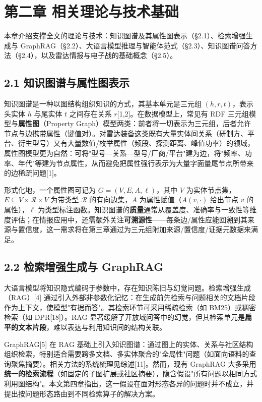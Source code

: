\documentclass[12pt,a4paper]{ctexart}
\begin{document}
\section*{第二章 相关理论与技术基础}

本章介绍支撑全文的理论与技术：知识图谱及其属性图表示（§2.1）、检索增强生成与 GraphRAG（§2.2）、大语言模型推理与智能体范式（§2.3）、知识图谱问答方法（§2.4），以及雷达情报与电子战的基础概念（§2.5）。

\subsection*{2.1 知识图谱与属性图表示}

知识图谱是一种以图结构组织知识的方式，其基本单元是三元组 $(h, r, t)$，表示头实体 $h$ 与尾实体 $t$ 之间存在关系 $r$[1,2]。在数据模型上，常见有 RDF 三元组模型与\textbf{属性图}（Property Graph）模型两类：前者将一切表示为三元组，后者允许节点与边携带属性（键值对）。对雷达装备这类既有大量实体间关系（研制方、平台、衍生型号）又有大量数值/枚举属性（频段、探测距离、峰值功率）的领域，属性图模型更为自然：可将"型号—关系—型号/厂商/平台"建为边，将"频率、功率、年代"等建为节点属性，从而避免把属性强行表示为大量字面量尾节点所带来的边稀疏问题[1]。

形式化地，一个属性图可记为 $G=(V, E, A, \ell)$，其中 $V$ 为实体节点集，$E\subseteq V\times \mathcal{R}\times V$ 为带类型 $\mathcal{R}$ 的有向边集，$A$ 为属性赋值（$A(v,\cdot)$ 给出节点 $v$ 的属性），$\ell$ 为类型标注函数。知识图谱的\textbf{质量}通常从覆盖度、准确率与一致性等维度评估；在情报应用中，还需额外关注\textbf{可溯源性}——每条边/属性应能回溯到其来源与置信度，这一需求将在第三章通过为三元组附加来源/置信度/证据元数据来满足。

\subsection*{2.2 检索增强生成与 GraphRAG}

大语言模型将知识隐式编码于参数中，存在知识陈旧与幻觉问题。检索增强生成（RAG）[4] 通过引入外部非参数化记忆：在生成前先检索与问题相关的文档片段作为上下文，使模型"有据而答"。其检索环节可采用稀疏检索（如 BM25）或稠密检索（如 DPR[18]）。RAG 显著缓解了开放域问答中的幻觉，但其检索单元是\textbf{扁平的文本片段}，难以表达与利用知识间的结构关联。

GraphRAG[5] 在 RAG 基础上引入知识图谱：通过图上的实体、关系与社区结构组织检索，特别适合需要跨多文档、多实体聚合的"全局性"问题（如面向语料的查询聚焦摘要）。相关方法的系统梳理见综述[11]。然而，现有 GraphRAG 大多采用\textbf{统一的检索流程}（如固定的子图扩展或社区摘要），隐含假设"所有问题以相同方式利用图结构"。本文第四章指出，这一假设在面对形态各异的问题时并不成立，并提出按问题形态路由到不同检索算子的解决方案。
\end{document}
